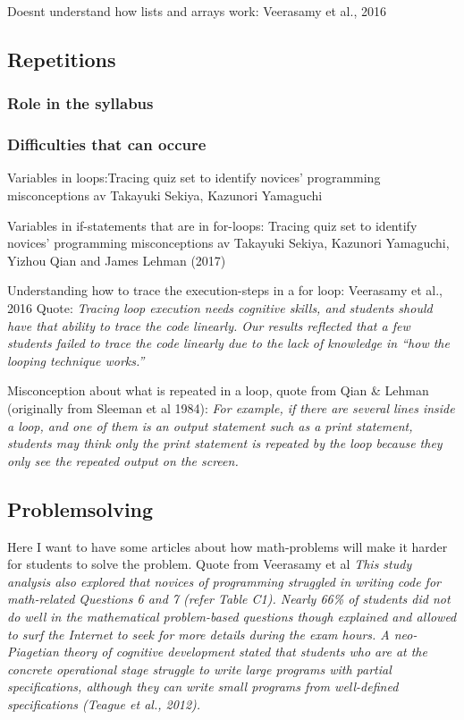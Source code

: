 \documentclass[twocolumn]{article}
\begin{document}
Doesnt understand how lists and arrays work: Veerasamy et al., 2016

\subsection{Repetitions}

\subsubsection{Role in the syllabus}

\subsubsection{Difficulties that can occure}

Variables in loops:Tracing quiz set to identify novices' programming misconceptions av Takayuki Sekiya, Kazunori Yamaguchi

Variables in if-statements that are in for-loops: Tracing quiz set to identify novices' programming misconceptions av Takayuki Sekiya, Kazunori Yamaguchi, Yizhou Qian and James Lehman (2017)

Understanding how to trace the execution-steps in a for loop: Veerasamy et al., 2016 Quote: \emph{Tracing loop execution needs cognitive skills, and students should have that ability to trace the code linearly. Our results reflected that a few students failed to trace the code linearly due to the lack of knowledge in “how the looping technique works.”}

Misconception about what is repeated in a loop, quote from Qian \& Lehman (originally from Sleeman et al 1984): \emph{ For example, if there are several lines inside a loop, and one of them is an output statement such as a print statement, students may think only the print statement is repeated by the loop because they only see the repeated output on the screen.}

\subsection{Problemsolving}

Here I want to have some articles about how math-problems will make it harder for students to solve the problem. Quote from Veerasamy et al \emph{This study analysis also explored that novices of programming struggled in writing code for math-related Questions 6 and 7 (refer Table C1). Nearly 66\% of students did not do well in the mathematical problem-based questions though explained and allowed to surf the Internet to seek for more details during the exam hours. A neo-Piagetian theory of cognitive development stated that students who are at the concrete operational stage struggle to write large programs with partial specifications, although they can write small programs from well-defined specifications (Teague et al., 2012).}
\end{document}
